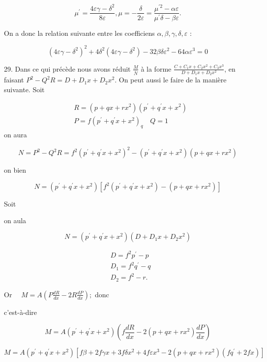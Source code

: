 \documentclass{article}
\begin{document}
\[
\mu^{\prime}=\frac{4 \varepsilon \gamma-\delta^{2}}{8 \varepsilon}, \mu=-\frac{\delta}{2 \varepsilon}=\frac{\mu^{\prime 2}-\alpha \varepsilon}{\mu^{\prime} \delta-\beta \varepsilon} .
\]

On a donc la relation suivante entre les coefficiens \(\alpha, \beta, \gamma, \delta, \varepsilon\) :

\[
\left(4 \varepsilon \gamma-\delta^{2}\right)^{2}+4 \delta^{2}\left(4 \varepsilon \gamma-\delta^{2}\right)-32 \beta \delta \varepsilon^{2}-64 \alpha \varepsilon^{3}=0
\]

29. Dans ce qui précède nous avons réduit \(\frac{M}{\bar{N}}\) à la forme \(\frac{C+C_{1} x+C_{2} x^{2}+C_{3} x^{3}}{D+D_{1} x+D_{2} x^{2}}\), en faisant \(P^{2}-Q^{2} R=D+D_{1} x+D_{2} x^{2}\). On peut aussi le faire de la manière suivante. Soit

\[
\begin{aligned}
& R=\left(p+q x+r x^{2}\right)\left(p^{\prime}+q^{\prime} x+x^{2}\right) \\
& P=f\left(p^{\prime}+q^{\prime} x+x^{2}\right)_{q} \quad Q=1
\end{aligned}
\]
on aura

\[
N=P^{2}-Q^{2} R=f^{2}\left(p^{\prime}+q^{\prime} x+x^{2}\right)^{2}-\left(p^{\prime}+q^{\prime} x+x^{2}\right)\left(p+q x+r x^{2}\right)
\]

on bien

\[
N=\left(p^{\prime}+q^{\prime} x+x^{2}\right)\left[f^{2}\left(p^{\prime}+q^{\prime} x+x^{2}\right)-\left(p+q x+r x^{2}\right)\right]
\]

Soit

on aula

\[
N=\left(p^{\prime}+q^{\prime} x+x^{2}\right)\left(D+D_{1} x+D_{2} x^{2}\right)
\]

\[
\begin{aligned}
& D=f^{2} p^{\prime}-p \\
& D_{1}=f^{2} q^{\prime}-q \\
& D_{2}=f^{2}-r .
\end{aligned}
\]

Or \(\quad M=A\left(P \frac{d R}{d x}-2 R \frac{d P}{d x}\right) ;\) donc

c'est-à-dire

\[
M=A\left(p^{\prime}+q^{\prime} x+x^{2}\right)\left(f \frac{d R}{d x}-2\left(p+q x+r x^{2}\right) \frac{d P}{d x}\right)
\]

\(M=A\left(p^{\prime}+q^{\prime} x+x^{2}\right)\left[f \beta+2 f \gamma x+3 f \delta x^{2}+4 f \varepsilon x^{3}-2\left(p+q x+r x^{2}\right)\left(f q^{\prime}+2 f x\right)\right]\)
\end{document}
